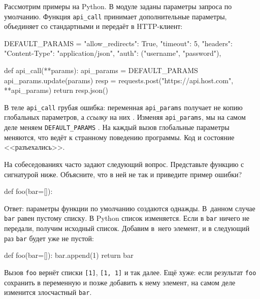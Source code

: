 
Рассмотрим примеры на Python. В модуле заданы параметры запроса по
умолчанию. Функция \verb|api_call| принимает дополнительные параметры,
объединяет со стандартными и передаёт в HTTP-клиент:

\begin{english}
  \begin{python/lines}
DEFAULT_PARAMS = {
    "allow_redirects": True,
    "timeout": 5,
    "headers": {"Content-Type": "application/json"},
    "auth": ("username", "password"),
}

def api_call(**params):
    api_params = DEFAULT_PARAMS
    api_params.update(params)
    resp = requests.post("https://api.host.com", **api_params)
    return resp.json()
  \end{python/lines}
\end{english}


В теле \verb|api_call| грубая ошибка: переменная \verb|api_params| получает
не копию глобальных параметров, а \emph{ссылку} на них . Изменяя
\verb|api_params|, мы на самом деле меняем \verb|DEFAULT_PARAMS|
. На каждый вызов глобальные параметры меняются, что ведёт к
странному поведению программы. Код и состояние <<разъехались>>.


На собеседованиях часто задают следующий вопрос. Представьте функцию с
сигнатурой ниже. Объясните, что в ней не так и приведите пример ошибки?

\begin{english}
  \begin{python}
def foo(bar=[]):
  \end{python}
\end{english}

Ответ: параметры функции по умолчанию создаются однажды. В~данном случае
\verb|bar| равен пустому списку. В Python список изменяется. Если в
\verb|bar| ничего не передали, получим исходный список. Добавим в~него
элемент, и в следующий раз \verb|bar| будет уже не пустой:

\begin{english}
  \begin{python}
def foo(bar=[]):
    bar.append(1)
    return bar
  \end{python}
\end{english}

Вызов \verb|foo| вернёт списки \verb|[1]|, \verb|[1, 1]| и так
далее. Ещё хуже: если результат \verb|foo| сохранить в переменную и позже
добавить к нему элемент, на самом деле изменится злосчастный \verb|bar|.

